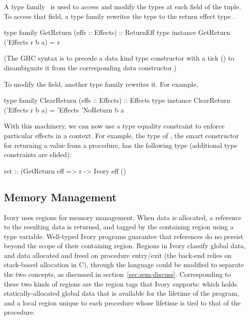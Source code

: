 A type family~\cite{typefamilies} is used to access and modify the types at each field of
the tuple. To access that field, a type family rewrites the  type to
the return effect type .

\begin{code}
type family   GetReturn (effs :: Effects) :: ReturnEff
type instance GetReturn ('Effects r b a) = r
\end{code}

\noindent
(The GHC syntax is to precede a data kind type constructor with a tick ()
to disambiguate it from the corresponding data constructor.)

To modify the field, another type family rewrites it. For example,

\begin{code}
type family   ClearReturn (effs :: Effects) :: Effects
type instance ClearReturn ('Effects r b a) =
  'Effects 'NoReturn b a
\end{code}

With this machinery, we can now use a type equality constraint to enforce
particular effects in a context. For example, the type of , the smart
constructor for returning a value from a procedure, has the following type
(additional type constraints are elided):

\begin{code}
ret :: (GetReturn eff %
    => r -> Ivory eff ()
\end{code}

\subsection{Memory Management}
\label{sec:ref}

Ivory uses regions for memory management.  When data is allocated, a reference
to the resulting data is returned, and tagged by the containing region using a
type variable.  Well-typed Ivory programs guarantee that references do no
persist beyond the scope of their containing region.  Regions in Ivory classify
global data, and data allocated and freed on procedure entry/exit (the back-end
relies on stack-based allocation in C), through the language could be modified
to separate the two concepts, as discussed in section~\ref{sec:sem-discuss}.
Corresponding to these two kinds of regions are the region tags that Ivory
supports:  which holds statically-allocated global data that is
available for the lifetime of the program, and a local region unique to each
procedure whose lifetime is tied to that of the procedure.

